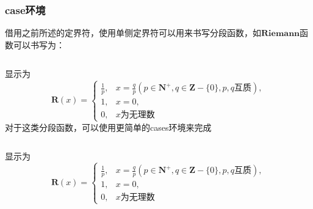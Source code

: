 \subsubsection{case环境}
借用之前所述的定界符，使用单侧定界符可以用来书写分段函数，如$\textbf{Riemann}$函数可以书写为：
\inputminted[linenos,frame=lines]{latex}{code/case.tex}
显示为
\[
\mathbf{R}(x)=\left\{\begin{array}{ll}
\frac{1}{p},&x=\frac{q}{p}(p\in \mathbf{N}^{+},q\in \mathbf{Z}-\{0\},p,q\text{互质}),\\
1,&x=0,\\
0,&x\text{为无理数}
\end{array}\right.
\]
对于这类分段函数，可以使用更简单的cases环境来完成
\inputminted[linenos,frame=lines]{latex}{code/cases.tex}
显示为
\[
\mathbf{R}(x)=\begin{cases}
\frac{1}{p},&x=\frac{q}{p}(p\in \mathbf{N}^{+},q\in \mathbf{Z}-\{0\},p,q\text{互质}),\\
1,&x=0,\\
0,&x\text{为无理数}
\end{cases}
\]